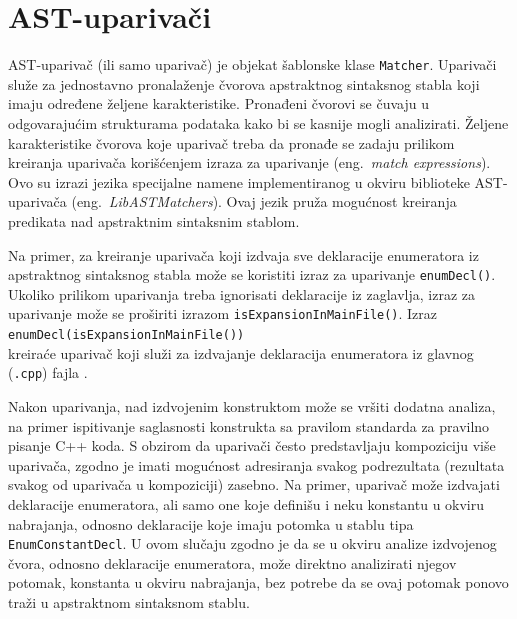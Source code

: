 \documentclass[12pt,oneside]{memoir}
\begin{document}
\section{AST-upariva\v{c}i}
\label{sec:matchers}

AST-upariva\v{c} (ili samo upariva\v{c}) je objekat \v{s}ablonske klase \texttt{Matcher}. Upariva\v{c}i slu\v{z}e za jednostavno
pronala\v{z}enje \v{c}vorova apstraktnog sintaksnog stabla koji imaju određene \v{z}eljene karakteristike. Pronađeni \v{c}vorovi se 
\v{c}uvaju u odgovaraju\'{c}im strukturama podataka kako bi se kasnije mogli analizirati. \v{Z}eljene karakteristike \v{c}vorova koje upariva\v{c} treba da pronađe se zadaju prilikom kreiranja upariva\v{c}a kori\v{s}\'{c}enjem izraza za uparivanje (eng.~\textit{match expressions}).
Ovo su izrazi jezika specijalne namene implementiranog u okviru biblioteke AST-upariva\v{c}a (eng.~\textit{LibASTMatchers}). Ovaj jezik pru\v{z}a mogu\'{c}nost kreiranja predikata nad apstraktnim sintaksnim stablom.

\par
Na primer, za kreiranje upariva\v{c}a koji izdvaja sve deklaracije enumeratora iz apstraktnog sintaksnog stabla mo\v{z}e se koristiti izraz za uparivanje \texttt{enumDecl()}. Ukoliko prilikom uparivanja treba ignorisati deklaracije iz zaglavlja, izraz za uparivanje mo\v{z}e se pro\v{s}iriti izrazom \texttt{isExpansionIn\-MainFile()}. Izraz \\ \texttt{enumDecl(isExpansionInMainFile())} \\ kreira\'{c}e upariva\v{c} koji slu\v{z}i za izdvajanje deklaracija enumeratora iz glavnog (\texttt{.cpp}) fajla \cite{ASTMatcherReference, MatchingClangAST}.

Nakon uparivanja, nad izdvojenim konstruktom mo\v{z}e se vr\v{s}iti dodatna analiza, na primer ispitivanje saglasnosti konstrukta sa pravilom standarda za pravilno pisanje C++ koda.
S obzirom da upariva\v{c}i \v{c}esto predstavljaju kompoziciju vi\v{s}e upariva\v{c}a, zgodno je imati mogu\'{c}nost adresiranja svakog podrezultata (rezultata svakog od upariva\v{c}a u kompoziciji) zasebno. Na primer, upariva\v{c} mo\v{z}e izdvajati deklaracije enumeratora, ali samo one koje defini\v{s}u i neku konstantu u okviru nabrajanja, odnosno deklaracije koje imaju potomka u stablu tipa \texttt{EnumConstantDecl}. U ovom slu\v{c}aju
zgodno je da se u okviru analize izdvojenog \v{c}vora, odnosno deklaracije enumeratora, mo\v{z}e direktno analizirati njegov potomak, konstanta u okviru nabrajanja, bez potrebe da se ovaj potomak ponovo tra\v{z}i u apstraktnom sintaksnom stablu.
\end{document}

